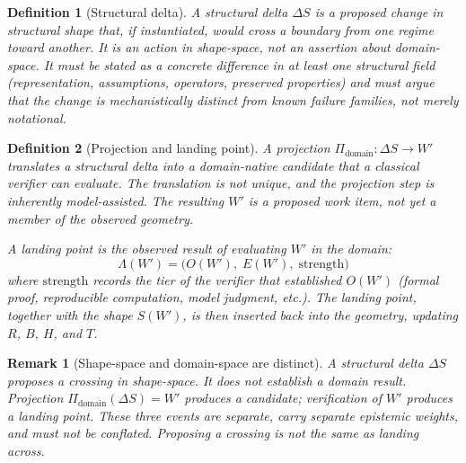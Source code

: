 \documentclass[11pt]{article}
\theoremstyle{gowthm}
\newtheorem{definition}{Definition}[section]
\newtheorem{remark}{Remark}[section]
\theoremstyle{gowplain}
\begin{document}
\begin{definition}[Structural delta]
A \emph{structural delta} $\Delta S$ is a proposed change in structural shape
that, if instantiated, would cross a boundary from one regime toward another.
It is an action in shape-space, not an assertion about domain-space. It must
be stated as a concrete difference in at least one structural field (representation,
assumptions, operators, preserved properties) and must argue that the change
is mechanistically distinct from known failure families, not merely notational.
\end{definition}

\begin{definition}[Projection and landing point]
A \emph{projection} $\Pi_{\text{domain}} : \Delta S \to W'$ translates a
structural delta into a domain-native candidate that a classical verifier can
evaluate. The translation is not unique, and the projection step is inherently
model-assisted. The resulting $W'$ is a \emph{proposed work item}, not yet
a member of the observed geometry.

A \emph{landing point} is the observed result of evaluating $W'$ in the
domain:
\[
\Lambda(W') = \bigl( O(W'),\; E(W'),\; \text{strength} \bigr)
\]
where $\text{strength}$ records the tier of the verifier that established $O(W')$
(formal proof, reproducible computation, model judgment, etc.). The landing
point, together with the shape $S(W')$, is then inserted back into the geometry,
updating $R$, $B$, $H$, and $T$.
\end{definition}

\begin{remark}[Shape-space and domain-space are distinct]
A structural delta $\Delta S$ proposes a crossing in shape-space. It does not
establish a domain result. Projection $\Pi_{\text{domain}}(\Delta S) = W'$
produces a candidate; verification of $W'$ produces a landing point. These three
events are separate, carry separate epistemic weights, and must not be conflated.
Proposing a crossing is not the same as landing across.
\end{remark}
\end{document}
